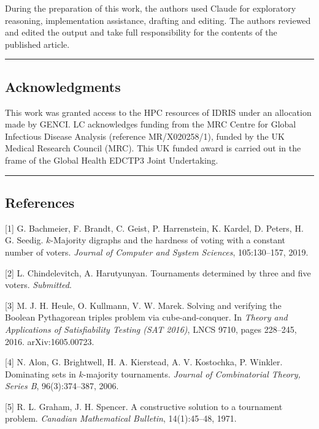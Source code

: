\documentclass[
]{article}
\begin{document}
During the preparation of this work, the authors used Claude for
exploratory reasoning, implementation assistance, drafting and editing.
The authors reviewed and edited the output and take full responsibility
for the contents of the published article.

\begin{center}\rule{0.5\linewidth}{0.5pt}\end{center}

\subsection{Acknowledgments}\label{acknowledgments}

This work was granted access to the HPC resources of IDRIS under an
allocation made by GENCI. LC acknowledges funding from the MRC Centre
for Global Infectious Disease Analysis (reference MR/X020258/1), funded
by the UK Medical Research Council (MRC). This UK funded award is
carried out in the frame of the Global Health EDCTP3 Joint Undertaking.

\begin{center}\rule{0.5\linewidth}{0.5pt}\end{center}

\subsection{References}\label{references}

{[}1{]} G. Bachmeier, F. Brandt, C. Geist, P. Harrenstein, K. Kardel, D.
Peters, H. G. Seedig. \(k\)-Majority digraphs and the hardness of voting
with a constant number of voters. \emph{Journal of Computer and System
Sciences}, 105:130--157, 2019.

{[}2{]} L. Chindelevitch, A. Harutyunyan. Tournaments determined by
three and five voters. \emph{Submitted}.

{[}3{]} M. J. H. Heule, O. Kullmann, V. W. Marek. Solving and verifying
the Boolean Pythagorean triples problem via cube-and-conquer. In
\emph{Theory and Applications of Satisfiability Testing (SAT 2016)},
LNCS 9710, pages 228--245, 2016. arXiv:1605.00723.

{[}4{]} N. Alon, G. Brightwell, H. A. Kierstead, A. V. Kostochka, P.
Winkler. Dominating sets in \(k\)-majority tournaments. \emph{Journal of
Combinatorial Theory, Series B}, 96(3):374--387, 2006.

{[}5{]} R. L. Graham, J. H. Spencer. A constructive solution to a
tournament problem. \emph{Canadian Mathematical Bulletin}, 14(1):45--48,
1971.
\end{document}
